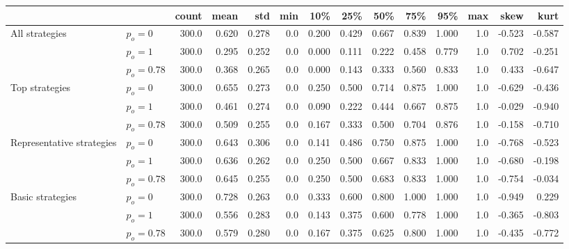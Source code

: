 \begin{tabular}{llrrrrrrrrrrrr}
\toprule
                 &            &  count &   mean &    std &  min &    10\% &    25\% &    50\% &    75\% &    95\% &  max &   skew &   kurt \\
\midrule
\rowcolor{Gray}
All strategies & $p_o=0$ &  300.0 &  0.620 &  0.278 &  0.0 &  0.200 &  0.429 &  0.667 &  0.839 &  1.000 &  1.0 & -0.523 & -0.587 \\
\rowcolor{Gray}
                 & $p_o=1$ &  300.0 &  0.295 &  0.252 &  0.0 &  0.000 &  0.111 &  0.222 &  0.458 &  0.779 &  1.0 &  0.702 & -0.251 \\
\rowcolor{Gray}
                 & $p_o=0.78$ &  300.0 &  0.368 &  0.265 &  0.0 &  0.000 &  0.143 &  0.333 &  0.560 &  0.833 &  1.0 &  0.433 & -0.647 \\
                 \midrule
Top strategies & $p_o=0$ &  300.0 &  0.655 &  0.273 &  0.0 &  0.250 &  0.500 &  0.714 &  0.875 &  1.000 &  1.0 & -0.629 & -0.436 \\
                 & $p_o=1$ &  300.0 &  0.461 &  0.274 &  0.0 &  0.090 &  0.222 &  0.444 &  0.667 &  0.875 &  1.0 & -0.029 & -0.940 \\
                 & $p_o=0.78$ &  300.0 &  0.509 &  0.255 &  0.0 &  0.167 &  0.333 &  0.500 &  0.704 &  0.876 &  1.0 & -0.158 & -0.710 \\
                 \midrule
\rowcolor{Gray}
Representative strategies & $p_o=0$ &  300.0 &  0.643 &  0.306 &  0.0 &  0.141 &  0.486 &  0.750 &  0.875 &  1.000 &  1.0 & -0.768 & -0.523 \\
\rowcolor{Gray}
                 & $p_o=1$ &  300.0 &  0.636 &  0.262 &  0.0 &  0.250 &  0.500 &  0.667 &  0.833 &  1.000 &  1.0 & -0.680 & -0.198 \\
\rowcolor{Gray}
                 & $p_o=0.78$ &  300.0 &  0.645 &  0.255 &  0.0 &  0.250 &  0.500 &  0.683 &  0.833 &  1.000 &  1.0 & -0.754 & -0.034 \\
                 \midrule
Basic strategies & $p_o=0$ &  300.0 &  0.728 &  0.263 &  0.0 &  0.333 &  0.600 &  0.800 &  1.000 &  1.000 &  1.0 & -0.949 &  0.229 \\
                 & $p_o=1$ &  300.0 &  0.556 &  0.283 &  0.0 &  0.143 &  0.375 &  0.600 &  0.778 &  1.000 &  1.0 & -0.365 & -0.803 \\
                 & $p_o=0.78$ &  300.0 &  0.579 &  0.280 &  0.0 &  0.167 &  0.375 &  0.625 &  0.800 &  1.000 &  1.0 & -0.435 & -0.772 \\
\bottomrule
\end{tabular}
